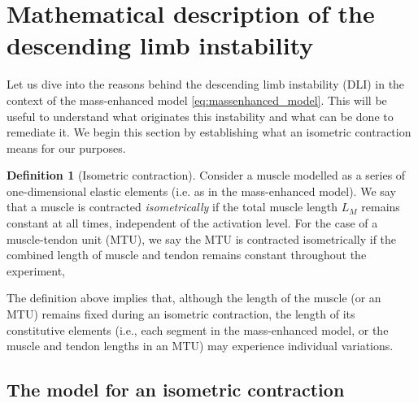 \documentclass{sfuthesis}
\numberwithin{equation}{section}
\numberwithin{figure}{chapter}
\numberwithin{table}{chapter}
\theoremstyle{definition}
\newtheorem{definition}{Definition}[chapter]
\begin{document}
\section{Mathematical description of the descending limb instability} \label{sec:dli}

Let us dive into the reasons behind the descending limb instability (DLI) in the context of the mass-enhanced model \eqref{eq:massenhanced_model}. This will be useful to understand what originates this instability and what can be done to remediate it. We begin this section by establishing what an isometric contraction means for our purposes.

\begin{definition}[Isometric contraction] \label{def:isometric_contraction}
    Consider a muscle modelled as a series of one-dimensional elastic elements (i.e. as in the mass-enhanced model). We say that a muscle is contracted \textit{isometrically} if the total muscle length $L_M$ remains constant at all times, independent of the activation level. For the case of a muscle-tendon unit (MTU), we say the MTU is contracted isometrically if the combined length of muscle and tendon remains constant throughout the experiment, 
\end{definition}

The definition above implies that, although the length of the muscle (or an MTU) remains fixed during an isometric contraction, the length of its constitutive elements (i.e., each segment in the mass-enhanced model, or the muscle and tendon lengths in an MTU) may experience individual variations.

\subsection{The model for an isometric contraction}
\end{document}
